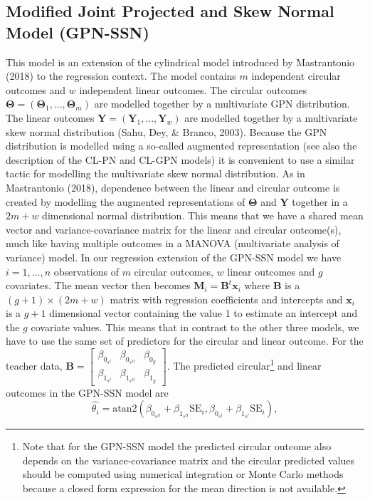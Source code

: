 \documentclass[man]{apa6}
\let\rmarkdownfootnote\footnote%
\def\footnote{\protect\rmarkdownfootnote}
\begin{document}
\subsection{Modified Joint Projected and Skew Normal Model (GPN-SSN)}\label{CL-GPN_multivariate}

This model is an extension of the cylindrical model introduced by
Mastrantonio (2018) to the regression context. The model contains \(m\)
independent circular outcomes and \(w\) independent linear outcomes. The
circular outcomes \(\boldsymbol{\Theta} = (\boldsymbol{\Theta}_1, \dots,  \boldsymbol{\Theta}_m)\) are modelled together by a multivariate GPN
distribution. The linear outcomes \(\boldsymbol{Y} = (\boldsymbol{Y}_1, \dots,  \boldsymbol{Y}_w)\) are modelled together by a multivariate skew normal
distribution (Sahu, Dey, \& Branco, 2003). Because the GPN distribution is modelled
using a so-called augmented representation (see also the description of the
CL-PN and CL-GPN models) it is convenient to use a similar tactic for
modelling the multivariate skew normal distribution. As in
Mastrantonio (2018), dependence between the linear and circular outcome is
created by modelling the augmented representations of \(\boldsymbol{\Theta}\)
and \(\boldsymbol{Y}\) together in a \(2m + w\) dimensional normal
distribution.\newline
\indent This means that we have a shared mean vector and variance-covariance
matrix for the linear and circular outcome(s), much like having multiple
outcomes in a MANOVA (multivariate analysis of variance) model. In our
regression extension of the GPN-SSN model we have \(i = 1, \dots, n\)
observations of \(m\) circular outcomes, \(w\) linear outcomes and \(g\)
covariates. The mean vector then becomes \(\boldsymbol{M}_i = \boldsymbol{B}^t\boldsymbol{x}_i\) where \(\boldsymbol{B}\) is a \((g + 1) \times (2m + w)\) matrix with regression coefficients and intercepts and
\(\boldsymbol{x}_i\) is a \(g + 1\) dimensional vector containing the value 1 to
estimate an intercept and the \(g\) covariate values. This means that in contrast
to the other three models, we have to use the same set of predictors for the
circular and linear outcome.\newline
\indent For the teacher data, \(\boldsymbol{B} = \begin{bmatrix} \beta_{0_{s^{I}}} & \beta_{0_{s^{II}}} & \beta_{0_{y}}\\ \beta_{1_{s^{I}}} & \beta_{1_{s^{II}}} & \beta_{1_{y}} \end{bmatrix}\). The predicted circular\footnote{Note that for the  GPN-SSN model the predicted circular outcome also depends on the variance-covariance matrix and the circular predicted values should be computed using numerical integration or Monte Carlo methods because a closed form expression for the mean direction is not available.} and
linear outcomes in the GPN-SSN model are
\[\hat{\theta_i} = \mbox{atan2}(\beta_{0_{s^{II}}} +
\beta_{1_{s^{II}}}\text{SE}_i,\beta_{0_{s^{I}}} +
\beta_{1_{s^{I}}}\text{SE}_i),\]
\end{document}
